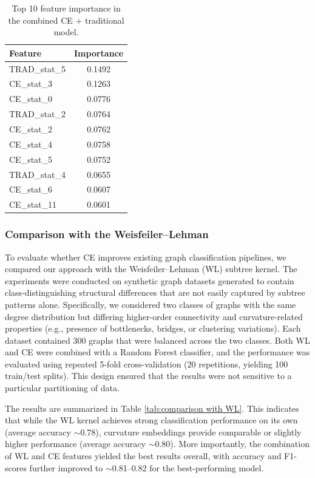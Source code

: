 \documentclass[preprint,12pt,number]{elsarticle}
\theoremstyle{plain} %
\theoremstyle{definition} %
\begin{document}
\begin{table}[H]
\centering
\caption{Top 10 feature importance in the combined CE + traditional model.}
\label{tab:feature_importance}
\begin{tabular}{lc}
\hline
Feature & Importance \\
\hline
TRAD\_stat\_5 & 0.1492 \\
CE\_stat\_3   & 0.1263 \\
CE\_stat\_0   & 0.0776 \\
TRAD\_stat\_2 & 0.0764 \\
CE\_stat\_2   & 0.0762 \\
CE\_stat\_4   & 0.0758 \\
CE\_stat\_5   & 0.0752 \\
TRAD\_stat\_4 & 0.0655 \\
CE\_stat\_6   & 0.0607 \\
CE\_stat\_11  & 0.0601 \\
\hline
\end{tabular}
\end{table}

\subsubsection{Comparison with the Weisfeiler–Lehman}
To evaluate whether CE improves existing graph classification pipelines, we compared our approach with the Weisfeiler–Lehman (WL) subtree kernel. The experiments were conducted on synthetic graph datasets generated to contain class-distinguishing structural differences that are not easily captured by subtree patterns alone. Specifically, we considered two classes of graphs with the same degree distribution but differing higher-order connectivity and curvature-related properties (e.g., presence of bottlenecks, bridges, or clustering variations). Each dataset contained 300 graphs that were balanced across the two classes.
Both WL and CE were combined with a Random Forest classifier, and the performance was evaluated using repeated 5-fold cross-validation (20 repetitions, yielding 100 train/test splits). This design ensured that the results were not sensitive to a particular partitioning of data.

The results are summarized in Table \ref{tab:comparison with WL}. This indicates that while the WL kernel achieves strong classification performance on its own (average accuracy $\sim$0.78), curvature embeddings provide comparable or slightly higher performance (average accuracy $\sim$0.80). More importantly, the combination of WL and CE features yielded the best results overall, with accuracy and F1-scores further improved to $\sim$0.81–0.82 for the best-performing model.
\end{document}
